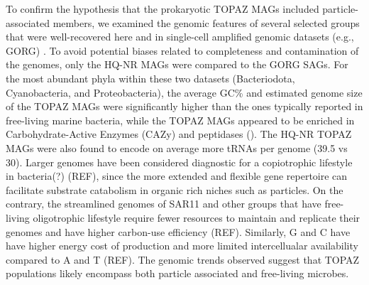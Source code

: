 \documentclass[12pt]{article}
\numberwithin{equation}{section}
\begin{document}
To confirm the hypothesis that the prokaryotic TOPAZ MAGs included particle-associated members, we examined the genomic features of several selected groups that were well-recovered here and in single-cell amplified genomic datasets (e.g., GORG) \citep{Pachiadaki_2019}.  To avoid potential biases related to completeness and contamination of the genomes, only the HQ-NR MAGs were compared to the GORG SAGs. For the most abundant phyla within these two datasets (Bacteriodota, Cyanobacteria, and Proteobacteria), the average GC\% and estimated genome size of the TOPAZ MAGs were significantly higher than the ones typically reported in free-living marine bacteria, while the TOPAZ MAGs appeared to be enriched in Carbohydrate-Active Enzymes (CAZy) and peptidases (). The HQ-NR TOPAZ MAGs were also found to encode on average more tRNAs per genome (39.5 vs 30). Larger genomes have been considered diagnostic for a copiotrophic lifestyle in bacteria(?) (REF), since the more extended and flexible gene repertoire can facilitate substrate catabolism in organic rich niches such as particles. On the contrary, the streamlined genomes of SAR11 and other groups that have free-living oligotrophic lifestyle require fewer resources to maintain and replicate their genomes and have higher carbon-use efficiency (REF). Similarly, G and C have  have higher energy cost of production and more limited intercellualar availability compared to A and T (REF). The genomic trends observed suggest that TOPAZ populations likely encompass both particle associated and free-living microbes. 
\end{document}
